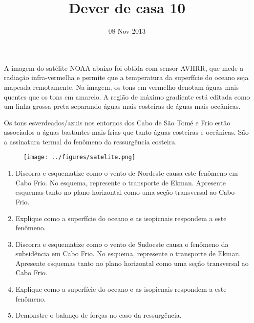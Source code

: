 \documentclass[12pt,portuguese,a4paper,pdftex]{article}
\title{Dever de casa 10}
\date{08-Nov-2013} %
\begin{document}
\maketitle
\doublespacing

A imagem do satélite NOAA abaixo foi obtida com sensor AVHRR, que mede
a radiação infra-vermelha e permite que a temperatura da superfície do oceano
seja mapeada remotamente.  Na imagem, os tons em vermelho denotam águas mais
quentes que os tons em amarelo.  A região de máximo gradiente está editada como
um linha grossa preta separando águas mais costeiras de águas mais oceânicas.

Os tons esverdeados/azuis nos entornos dos Cabo de São Tomé e Frio estão
associados a águas bastantes mais frias que tanto águas costeiras e oceânicas.
São a assinatura termal do fenômeno da ressurgência costeira.

\begin{figure}[H]
\vspace{1cm}
  \centerline{\texttt{[image: ../figures/satelite.png]}}
\end{figure}

\begin{enumerate}
  \item Discorra e esquematize como o vento de Nordeste causa este fenômeno em
        Cabo Frio.  No esquema, represente o transporte de Ekman.  Apresente
        esquemas tanto no plano horizontal como uma seção transversal ao Cabo Frio.

  \item Explique como a superfície do oceano e as isopicnais respondem a este
        fenômeno.

  \item Discorra e esquematize como o vento de Sudoeste causa o fenômeno da
        subsidência em Cabo Frio.  No esquema, represente o transporte de
        Ekman.  Apresente esquemas tanto no plano horizontal como uma seção transversal ao Cabo Frio.

  \item Explique como a superfície do oceano e as isopicnais respondem a este
        fenômeno.

  \item Demonstre o balanço de forças no caso da ressurgência.
\end{enumerate}
\end{document}
